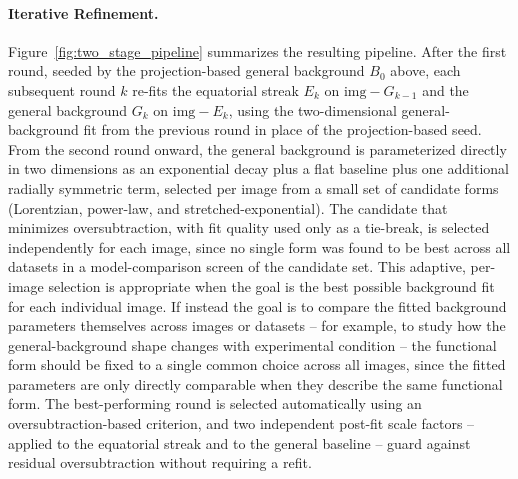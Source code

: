 \documentclass[iucr]{iucrjournals}
\begin{document}
\paragraph{Iterative Refinement.}

Figure~\ref{fig:two_stage_pipeline} summarizes the resulting pipeline. After the first round, seeded by the projection-based general background $B_0$ above, each subsequent round $k$ re-fits the equatorial streak $E_k$ on $\mathrm{img} - G_{k-1}$ and the general background $G_k$ on $\mathrm{img} - E_k$, using the two-dimensional general-background fit from the previous round in place of the projection-based seed. From the second round onward, the general background is parameterized directly in two dimensions as an exponential decay plus a flat baseline plus one additional radially symmetric term, selected per image from a small set of candidate forms (Lorentzian, power-law, and stretched-exponential). The candidate that minimizes oversubtraction, with fit quality used only as a tie-break, is selected independently for each image, since no single form was found to be best across all datasets in a model-comparison screen of the candidate set. This adaptive, per-image selection is appropriate when the goal is the best possible background fit for each individual image. If instead the goal is to compare the fitted background parameters themselves across images or datasets -- for example, to study how the general-background shape changes with experimental condition -- the functional form should be fixed to a single common choice across all images, since the fitted parameters are only directly comparable when they describe the same functional form. The best-performing round is selected automatically using an oversubtraction-based criterion, and two independent post-fit scale factors -- applied to the equatorial streak and to the general baseline -- guard against residual oversubtraction without requiring a refit.
\end{document}
